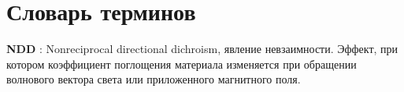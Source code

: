 \chapter*{Словарь терминов}             %

\textbf{NDD} : Nonreciprocal directional dichroism, явление невзаимности. Эффект, при котором коэффициент поглощения материала изменяется при обращении волнового вектора света или приложенного магнитного поля.
